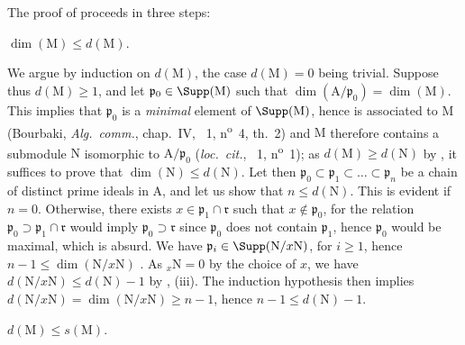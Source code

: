 The proof of  proceeds in three steps:

\begin{env}[16.2.3.2]
\label{0.16.2.3.2}
$\dim(\mathrm{M})\leq d(\mathrm{M})$.
\end{env}

We argue by induction on $d(\mathrm{M})$, the case $d(\mathrm{M})=0$ being trivial.
Suppose thus $d(\mathrm{M})\geq 1$, and let $\mathfrak{p}_0\in\Supp(\mathrm{M})$ such that $\dim(\mathrm{A}/\mathfrak{p}_0)=\dim(\mathrm{M})$.
This implies that $\mathfrak{p}_0$ is a \emph{minimal} element of $\Supp(\mathrm{M})$, hence is associated to $\mathrm{M}$ (Bourbaki, \emph{Alg.~comm.}, chap.~IV, \textsection~1, n\textsuperscript{o}~4, th.~2) and $\mathrm{M}$ therefore contains a submodule $\mathrm{N}$ isomorphic to $\mathrm{A}/\mathfrak{p}_0$ (\emph{loc.~cit.}, \textsection~1, n\textsuperscript{o}~1); as $d(\mathrm{M})\geq d(\mathrm{N})$ by , it suffices to prove that $\dim(\mathrm{N})\leq d(\mathrm{N})$.
Let then $\mathfrak{p}_0\subset\mathfrak{p}_1\subset\ldots\subset\mathfrak{p}_n$ be a chain of distinct prime ideals in $\mathrm{A}$, and let us show that $n\leq d(\mathrm{N})$.
This is evident if $n=0$.
Otherwise, there exists $x\in\mathfrak{p}_1\cap\mathfrak{r}$ such that $x\notin\mathfrak{p}_0$, for the relation $\mathfrak{p}_0\supset\mathfrak{p}_1\cap\mathfrak{r}$ would imply $\mathfrak{p}_0\supset\mathfrak{r}$ since $\mathfrak{p}_0$ does not contain $\mathfrak{p}_1$, hence $\mathfrak{p}_0$ would be maximal, which is absurd.
We have $\mathfrak{p}_i\in\Supp(\mathrm{N}/x\mathrm{N})$, for $i\geq 1$, hence $n-1\leq\dim(\mathrm{N}/x\mathrm{N})$ .
As ${}_x\mathrm{N}=0$ by the choice of $x$, we have $d(\mathrm{N}/x\mathrm{N})\leq d(\mathrm{N})-1$ by , (iii).
The induction hypothesis then implies $d(\mathrm{N}/x\mathrm{N})=\dim(\mathrm{N}/x\mathrm{N})\geq n-1$, hence $n-1\leq d(\mathrm{N})-1$.

\begin{env}[16.2.3.3]
\label{0.16.2.3.3}
$d(\mathrm{M})\leq s(\mathrm{M})$.
\end{env}

